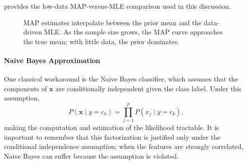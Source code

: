  provides the low-data MAP-versus-MLE comparison used in this discussion.

\begin{figure}[!htbp]
        \centering
{}
        \caption{MAP estimates interpolate between the prior mean and the data-driven MLE. As the sample size grows, the MAP curve approaches the true mean; with little data, the prior dominates.}
        \label{fig:lec4_mle_map}
    \end{figure}

\paragraph{Naive Bayes Approximation}
One classical workaround is the Naive Bayes classifier, which assumes that the components of \(\mathbf{x}\) are conditionally independent given the class label. Under this assumption,
\[
P(\mathbf{x} \mid y = c_k) = \prod_{j=1}^p P(x_j \mid y = c_k),
\]
making the computation and estimation of the likelihood tractable. It is important to remember that this factorization is justified only under the conditional independence assumption; when the features are strongly correlated, Naive Bayes can suffer because the assumption is violated.

